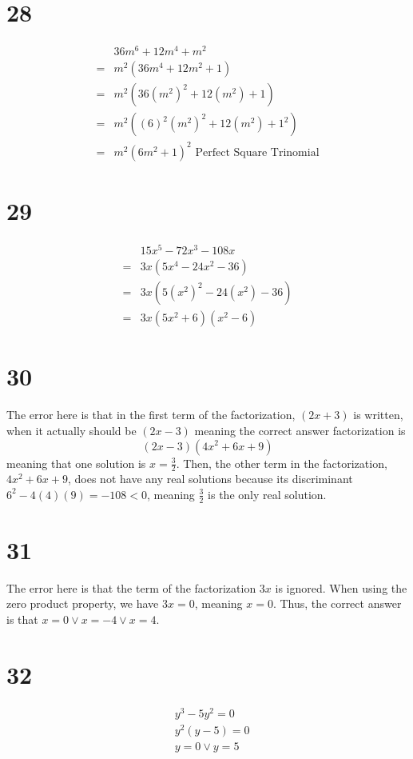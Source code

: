 \documentclass{article}
\theoremstyle{definition}
\begin{document}
\section*{28}
\[
\begin{array}{rl}
	& 36m^6+12m^4+m^2 \\
=	& m^2(36m^4+12m^2+1) \\
=	& m^2(36(m^2)^2+12(m^2)+1) \\
=	& m^2((6)^2(m^2)^2+12(m^2)+1^2) \\
=	& m^2(6m^2+1)^2\textrm{ Perfect Square Trinomial}
\end{array}
\]

\section*{29}
\[
\begin{array}{rl}
	& 15x^5-72x^3-108x \\
=	& 3x(5x^4-24x^2-36) \\
=	& 3x(5(x^2)^2-24(x^2)-36) \\
=	& 3x(5x^2+6)(x^2-6)
\end{array}
\]

\section*{30}
The error here is that in the first term of the factorization, $(2x+3)$ is written, when it actually should be $(2x-3)$ meaning the correct 
answer factorization is \[ (2x-3)(4x^2+6x+9) \] meaning that one solution is $x=\frac{3}{2}$. Then, the other term in the factorization, 
$4x^2+6x+9$, does not have any real solutions because its discriminant $6^2-4(4)(9)=-108<0$, meaning $\frac{3}{2}$ is the only real solution.

\section*{31}
The error here is that the term of the factorization $3x$ is ignored. When using the zero product property, we have $3x=0$, meaning $x=0$. 
Thus, the correct answer is that $x=0\vee x=-4\vee x=4$.

\section*{32}
\[
\begin{array}{rl}
	& y^3-5y^2=0 \\
	& y^2(y-5)=0 \\
	& y=0\vee y=5
\end{array}
\]
\end{document}
